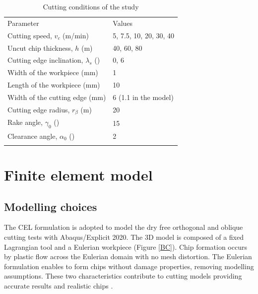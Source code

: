 \documentclass[final,5p,times,twocolumn]{elsarticle}
\begin{document}
%
\begin{table}[!h]
\begin{center}
\caption{\label{tab:CutCond} Cutting conditions of the study}
\begin{tabular}{ll}
\hline\noalign{\smallskip}
Parameter  & Values\\
\noalign{\smallskip}\hline\noalign{\smallskip}
Cutting speed, $v_c$ (m/min) & 5, 7.5, 10, 20, 30, 40\\
Uncut chip thickness, $h$ (\textmu{}m) & 40, 60, 80\\
Cutting edge inclination, $\lambda_s$ (\textdegree{}) & 0, 6\\
Width of the workpiece (mm) & 1\\
Length of the workpiece (mm) & 10\\
Width of the cutting edge (mm) & 6 (1.1 in the model)\\
Cutting edge radius, $r_\beta$ (\textmu{}m) & 20\\
Rake angle, $\gamma_0$ (\textdegree{}) & 15\\
Clearance angle, $\alpha_0$ (\textdegree{}) & 2\\
\noalign{\smallskip}\hline
\end{tabular}
\end{center}
\end{table}
%

\section{Finite element model}
\label{FEM}

\subsection{Modelling choices}

The CEL formulation is adopted to model the dry free orthogonal and oblique cutting tests with Abaqus/Explicit 2020. The 3D model is composed of a fixed Lagrangian tool and a Eulerian workpiece (Figure \ref{BC}). Chip formation occurs by plastic flow across the Eulerian domain with no mesh distortion. The Eulerian formulation enables to form chips without damage properties, removing modelling assumptions. These two characteristics contribute to cutting models providing accurate results and realistic chips \cite{ducobu_application_2016}.
\end{document}
